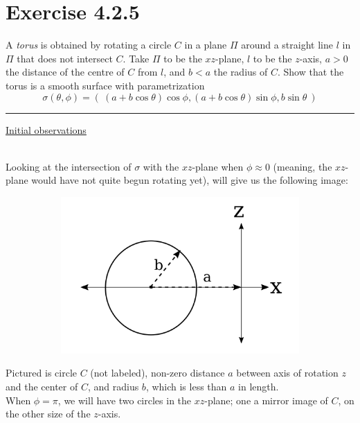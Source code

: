 \documentclass[12pt]{article}
\newcommand{\ulind}[1]
{
\noindent
\underline{#1}\\\\
\indent
}
\begin{document}
\maketitle

\section*{Exercise 4.2.5}
\indent
A \emph{torus} is obtained by rotating a circle $C$ in a plane $\Pi$ around a straight line $l$ in $\Pi$ that does not intersect $C$. Take $\Pi$ to be the $xz$-plane, $l$ to be the $z$-axis, $a>0$ the distance of the centre of $C$ from $l$, and $b < a$ the radius of $C$. Show that the torus is a smooth surface with parametrization
$$
\sigma(\theta,\phi) = ( \ (a+b\cos \theta)\cos \phi, (a+b\cos \theta)\sin \phi, b \sin \theta \ )
$$

\vspace{1cm}
\hrule
\vspace{1cm}
\noindent

\ulind{Initial observations}

Looking at the intersection of $\sigma$ with the $xz$-plane when $\phi \approx 0$ (meaning, the $xz$-plane would have not quite begun rotating yet), will give us the following image:

\begin{figure}[h!]
\centering
	\begin{subfigure}[b]{0.5\linewidth}
		\includegraphics[width=\linewidth]{./assets/4-2-5/torus-xz-intersection.png}
	\end{subfigure}
\end{figure}
\indent


Pictured is circle $C$ (not labeled), non-zero distance $a$ between axis of rotation $z$ and the center of $C$, and radius $b$, which is less than $a$ in length.\\
\indent
When $\phi = \pi$, we will have two circles in the $xz$-plane; one a mirror image of $C$, on the other size of the $z$-axis.
\end{document}

